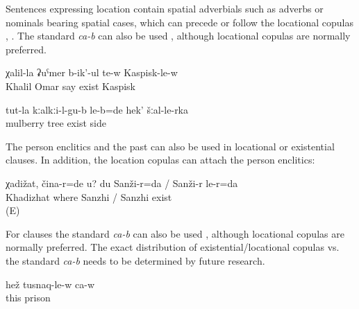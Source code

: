 Sentences expressing location contain spatial adverbials such as adverbs or nominals bearing spatial cases, which can precede or follow the locational copulas , . The standard  \textit{ca-b} can also be used , although locational copulas are normally preferred. 

\begin{exe}
	\ex	\label{ex:Omar's Khalil is in Kaspisk}
	\gll	χalil-la	ʡuˁmer	b-ik'-ul	te-w	Kaspisk-le-w\\
		Khalil	Omar	say	exist	Kaspisk\\
	\glt	{}

	\ex	\label{ex:‎They were under the mulberry tree, from that side}
	\gll	tut-la	kːalkːi-l-gu-b	le-b=de	hek'	šːal-le-rka\\
		mulberry	tree	exist		side\\
	\glt	{}

\end{exe}

The person enclitics  and the past   can also be used in locational or existential clauses. In addition, the location copulas can attach the person enclitics:

\begin{exe}
	\ex	\label{ex:‎Khadizhat, where are you? I am in Sanzhi}
	\gll	χadižat,	čina-r=de	u?	du	Sanži-r=da	/	Sanži-r	le-r=da\\
		Khadizhat	where			Sanzhi	/ Sanzhi exist\\
	\glt	{} (E)
\end{exe}

For  clauses the standard  \textit{ca-b} can also be used , although locational copulas are normally preferred. The exact distribution of existential/locational copulas vs. the standard  \textit{ca-b} needs to be determined by future research. 

 \begin{exe}
	\ex	\label{ex:‎He is in prison}
	\gll	hež	tusnaq-le-w	ca-w\\
		this	prison	\\
	\glt	{}
\end{exe}

